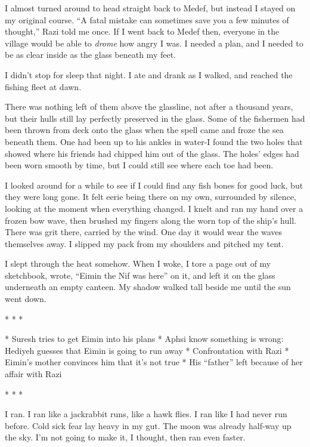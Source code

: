 I almost turned around to head straight back to Medef, but instead I
stayed on my original course.  ``A fatal mistake can sometimes save you
a few minutes of thought,'' Razi told me once.  If I went back to Medef
then, everyone in the village would be able to \emph{drome} how angry I
was.  I needed a plan, and I needed to be as clear inside as the glass
beneath my feet.

I didn't stop for sleep that night.  I ate and drank as I walked, and
reached the fishing fleet at dawn.

There was nothing left of them above the glassline, not after a
thousand years, but their hulls still lay perfectly preserved in the
glass.  Some of the fishermen had been thrown from deck onto the glass
when the spell came and froze the sea beneath them.  One had been up
to his ankles in water-I found the two holes that showed where his
friends had chipped him out of the glass.  The holes' edges had been
worn smooth by time, but I could still see where each toe had been.

I looked around for a while to see if I could find any fish bones for
good luck, but they were long gone.  It felt eerie being there on my
own, surrounded by silence, looking at the moment when everything
changed.  I knelt and ran my hand over a frozen bow wave, then brushed
my fingers along the worn top of the ship's hull.  There was grit
there, carried by the wind.  One day it would wear the waves
themselves away.  I slipped my pack from my shoulders and pitched my
tent.

I slept through the heat somehow.  When I woke, I tore a page out of
my sketchbook, wrote, ``Eimin the Nif was here'' on it, and left it on
the glass underneath an empty canteen.  My shadow walked tall beside
me until the sun went down.

\begin{center}* * *\end{center}

 * Suresh tries to get Eimin into his plans
 * Aphsi know something is wrong: Hediyeh guesses that Eimin is going
   to run away
 * Confrontation with Razi
   * Eimin's mother convinces him that it's not true
   * His ``father'' left because of her affair with Razi

\begin{center}* * *\end{center}

I ran.  I ran like a jackrabbit runs, like a hawk flies.  I ran like I
had never run before.  Cold sick fear lay heavy in my gut.  The moon
was already half-way up the sky.  I'm not going to make it, I thought,
then ran even faster.

